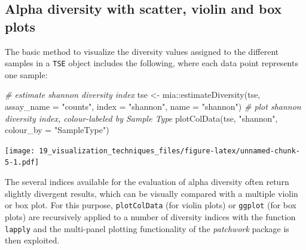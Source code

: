 \documentclass[
]{book}
\newenvironment{Shaded}{\begin{snugshade}}{\end{snugshade}}
\newcommand{\AttributeTok}[1]{\textcolor[rgb]{0.77,0.63,0.00}{#1}}
\newcommand{\CommentTok}[1]{\textcolor[rgb]{0.56,0.35,0.01}{\textit{#1}}}
\newcommand{\FunctionTok}[1]{\textcolor[rgb]{0.00,0.00,0.00}{#1}}
\newcommand{\NormalTok}[1]{#1}
\newcommand{\OtherTok}[1]{\textcolor[rgb]{0.56,0.35,0.01}{#1}}
\newcommand{\SpecialCharTok}[1]{\textcolor[rgb]{0.00,0.00,0.00}{#1}}
\newcommand{\StringTok}[1]{\textcolor[rgb]{0.31,0.60,0.02}{#1}}
\begin{document}
\hypertarget{alpha-diversity-with-scatter-violin-and-box-plots}{%
\subsection{Alpha diversity with scatter, violin and box plots}\label{alpha-diversity-with-scatter-violin-and-box-plots}}

The basic method to visualize the diversity values assigned to the
different samples in a \texttt{TSE} object includes the following, where each
data point represents one sample:

\begin{Shaded}
\begin{Highlighting}[]
\CommentTok{\# estimate shannon diversity index}
\NormalTok{tse }\OtherTok{\textless{}{-}}\NormalTok{ mia}\SpecialCharTok{::}\FunctionTok{estimateDiversity}\NormalTok{(tse, }
                              \AttributeTok{assay\_name =} \StringTok{"counts"}\NormalTok{,}
                              \AttributeTok{index =} \StringTok{"shannon"}\NormalTok{, }
                              \AttributeTok{name =} \StringTok{"shannon"}\NormalTok{)}
\CommentTok{\# plot shannon diversity index, colour{-}labeled by Sample Type}
\FunctionTok{plotColData}\NormalTok{(tse, }\StringTok{"shannon"}\NormalTok{, }\AttributeTok{colour\_by =} \StringTok{"SampleType"}\NormalTok{)}
\end{Highlighting}
\end{Shaded}

\texttt{[image: 19\_visualization\_techniques\_files/figure-latex/unnamed-chunk-5-1.pdf]}

The several indices available for the evaluation of alpha diversity
often return slightly divergent results, which can be visually
compared with a multiple violin or box plot. For this purpose,
\texttt{plotColData} (for violin plots) or \texttt{ggplot} (for box plots) are
recursively applied to a number of diversity indices with the function
\texttt{lapply} and the multi-panel plotting functionality of the \emph{patchwork}
package is then exploited.
\end{document}
